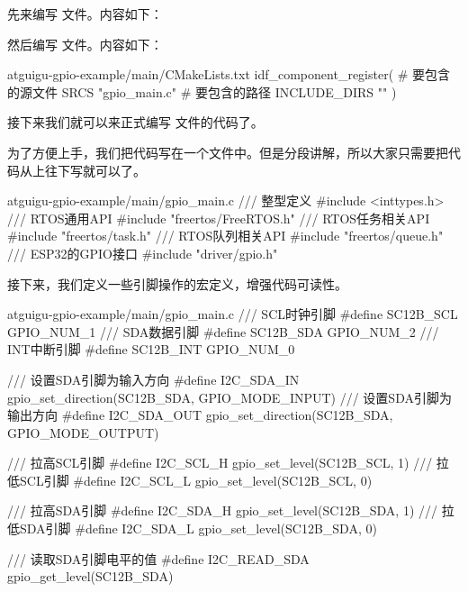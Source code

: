 \documentclass[lang=cn,newtx,10pt,scheme=chinese]{elegantbook}
\begin{document}
先来编写  文件。内容如下：


然后编写  文件。内容如下：

\begin{mycode}{atguigu-gpio-example/main/CMakeLists.txt}
idf_component_register(
    # 要包含的源文件
    SRCS "gpio_main.c"
    # 要包含的路径
    INCLUDE_DIRS ""
)
\end{mycode}

接下来我们就可以来正式编写  文件的代码了。

为了方便上手，我们把代码写在一个文件中。但是分段讲解，所以大家只需要把代码从上往下写就可以了。

\begin{mycode}{atguigu-gpio-example/main/gpio\_main.c}
/// 整型定义
#include <inttypes.h>
/// RTOS通用API
#include "freertos/FreeRTOS.h"
/// RTOS任务相关API
#include "freertos/task.h"
/// RTOS队列相关API
#include "freertos/queue.h"
/// ESP32的GPIO接口
#include "driver/gpio.h"
\end{mycode}

接下来，我们定义一些引脚操作的宏定义，增强代码可读性。

\begin{mycode}{atguigu-gpio-example/main/gpio\_main.c}
/// SCL时钟引脚
#define SC12B_SCL GPIO_NUM_1
/// SDA数据引脚
#define SC12B_SDA GPIO_NUM_2
/// INT中断引脚
#define SC12B_INT GPIO_NUM_0

/// 设置SDA引脚为输入方向
#define I2C_SDA_IN gpio_set_direction(SC12B_SDA, GPIO_MODE_INPUT)
/// 设置SDA引脚为输出方向
#define I2C_SDA_OUT gpio_set_direction(SC12B_SDA, GPIO_MODE_OUTPUT)

/// 拉高SCL引脚
#define I2C_SCL_H gpio_set_level(SC12B_SCL, 1)
/// 拉低SCL引脚
#define I2C_SCL_L gpio_set_level(SC12B_SCL, 0)

/// 拉高SDA引脚
#define I2C_SDA_H gpio_set_level(SC12B_SDA, 1)
/// 拉低SDA引脚
#define I2C_SDA_L gpio_set_level(SC12B_SDA, 0)

/// 读取SDA引脚电平的值
#define I2C_READ_SDA gpio_get_level(SC12B_SDA)
\end{mycode}
\end{document}
